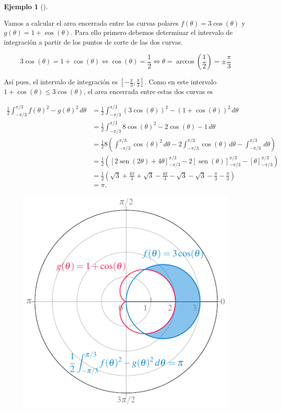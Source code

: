 \documentclass[
  a4paper,
]{scrreport}
\theoremstyle{definition}
\newtheorem{example}{Ejemplo}[chapter]
\theoremstyle{plain}
\theoremstyle{definition}
\theoremstyle{definition}
\theoremstyle{plain}
\theoremstyle{plain}
\theoremstyle{remark}
\begin{document}
\begin{example}[]\protect\hypertarget{exm-area-entre-curvas-polares}{}\label{exm-area-entre-curvas-polares}

Vamos a calcular el area encerrada entre las curvas polares
\(f(\theta)=3\cos(\theta)\) y \(g(\theta)=1+\cos(\theta)\). Para ello
primero debemos determinar el intervalo de integración a partir de los
puntos de corte de las dos curvas.

\[
3\cos(\theta) = 1 + \cos(\theta) \Leftrightarrow \cos(\theta) = \frac{1}{2} \Leftrightarrow \theta = \operatorname{arccos}\left(\frac{1}{2}\right) = \pm \frac{\pi}{3}
\]

Así pues, el intervalo de integración es
\([-\frac{\pi}{3},\frac{\pi}{3}]\). Como en este intervalo
\(1+\cos(\theta) \leq 3\cos(\theta)\), el area encerrada entre estas dos
curvas es

\begin{align*}
\frac{1}{2}\int_{-\pi/3}^{\pi/3}f(\theta)^2-g(\theta)^2\,d\theta 
&= \frac{1}{2} \int_{-\pi/3}^{\pi/3}(3\cos(\theta))^2 - (1+\cos(\theta))^2 \,d\theta \\
&= \frac{1}{2} \int_{-\pi/3}^{\pi/3}8\cos(\theta)^2 - 2\cos(\theta) - 1 \,d\theta \\
&= \frac{1}{2}8\left(\int_{-\pi/3}^{\pi/3}\cos(\theta)^2\,d\theta - 2\int_{-\pi/3}^{\pi/3}\cos(\theta)\,d\theta - \int_{-\pi/3}^{\pi/3}\,d\theta \right) \\
&= \frac{1}{2}\left([2\operatorname{sen}(2\theta)+4\theta]_{-\pi/3}^{\pi/3} - 2[\operatorname{sen}(\theta)]_{-\pi/3}^{\pi/3} - [\theta]_{-\pi/3}^{\pi/3} \right) \\
&= \frac{1}{2}\left(\sqrt{3}+\frac{4\pi}{3} +\sqrt{3} -\frac{4\pi}{3}- \sqrt{3} - \sqrt{3} - \frac{\pi}{3} -\frac{\pi}{3}\right)\\
&= \pi.
\end{align*}

\begin{figure}[H]

{\centering \includegraphics{img/integrales/area-entre-curvas-polares-2.pdf}

}
\end{figure}
\end{example}
\end{document}
